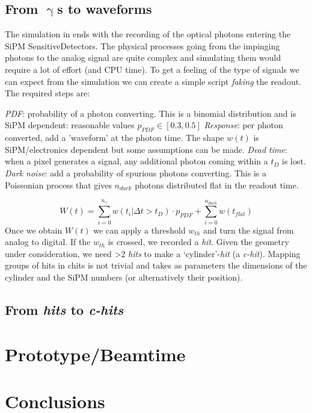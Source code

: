 \begin{refsection}
    \subsection{From $\upgamma$s to waveforms}
        The simulation in \gf ends with the recording of the optical photons entering the SiPM SensitiveDetectors.
        The physical processes going from the impinging photons to the analog signal are quite complex and simulating them would require a lot of effort (and CPU time).
        To get a feeling of the type of signals we can expect from the simulation we can create a simple script \textit{faking} the readout.
        The required steps are:
        \begin{outline}
            \1 \textit{PDF}: probability of a photon converting. 
            This is a binomial distribution and is SiPM dependent: reasonable values $p_{PDF}\in [0.3, 0.5]$
            \1 \textit{Response}: per photon converted, add a 'waveform' at the photon time. 
            The shape $w(t)$ is SiPM/electronics dependent but some assumptions can be made.
            \1 \textit{Dead time}: when a pixel generates a signal, any additional photon coming within a $t_D$ is lost.
            \1 \textit{Dark noise}: add a probability of spurious photons converting. 
            This is a Poissonian process that gives $n_{dark}$ photons distributed flat in the readout time.
        \end{outline}
        \begin{equation}
            W(t)=\sum_{i=0}^{n_\gamma} w(t_i|\Delta t>t_D)\cdot p_{PDF} + \sum_{i=0}^{n_{dark}} w(t_{flat}) 
        \end{equation}
        \begin{equation}
\end{equation}Once we obtain $W(t)$ we can apply a threshold $w_{th}$ and turn the signal from analog to digital. 
        If the $w_{th}$ is crossed, we recorded a \textit{hit}.
        Given the geometry under consideration, we need >2 \textit{hits} to make a `cylinder'-\textit{hit} (a \textit{c-hit}).
        Mapping groups of hits in chits is not trivial and takes as parameters the dimensions of the cylinder and the SiPM numbers (or alternatively their position).

    \subsection{From \textit{hits} to \textit{c-hits}}

\section{Prototype/Beamtime}

\section{Conclusions}

\printbibliography[
    heading = bibliographychapter,
    title=Bibliography on muEDM positron tracker
]

\end{refsection}